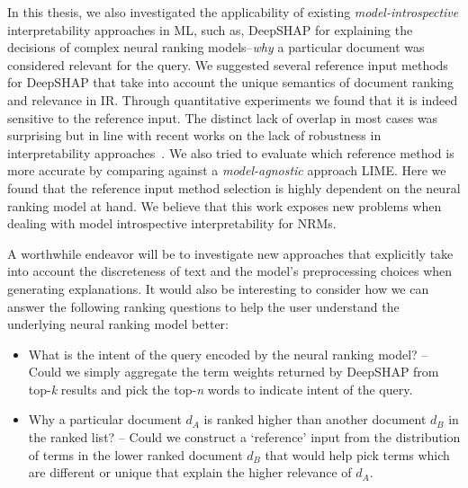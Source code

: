 In this thesis, we also investigated the applicability of existing \textit{model-introspective} interpretability approaches in ML, such as, DeepSHAP for explaining the decisions of complex neural ranking models--\textit{why} a particular document was considered relevant for the query. We suggested several reference input methods for DeepSHAP that take into account the unique semantics of document ranking and relevance in IR. Through quantitative experiments we found that it is indeed sensitive to the reference input. The distinct lack of overlap in most cases was surprising but in line with recent works on the lack of robustness in interpretability approaches~\citep{Ghorbani2017}. We also tried to evaluate which reference method is more accurate by comparing against a \textit{model-agnostic} approach LIME. Here we found that the reference input method selection is highly dependent on the neural ranking model at hand. We believe that this work exposes new problems when dealing with model introspective interpretability for NRMs. 

A worthwhile endeavor will be to investigate new approaches that explicitly take into account the discreteness of text and the model's preprocessing choices when generating explanations. It would also be interesting to consider how we can answer the following ranking questions to help the user understand the underlying neural ranking model better:

\begin{itemize}
    \item \textsf{What is the intent of the query encoded by the neural ranking model?} -- Could we simply aggregate the term weights returned by DeepSHAP from top-\textit{k} results and pick the top-\textit{n} words to indicate intent of the query.
    \item \textsf{Why a particular document $d_A$ is ranked higher than another document $d_B$ in the ranked list?} -- Could we construct a `reference' input from the distribution of terms in the lower ranked document $d_B$ that would help pick terms which are different or unique that explain the higher relevance of $d_A$.
\end{itemize}
